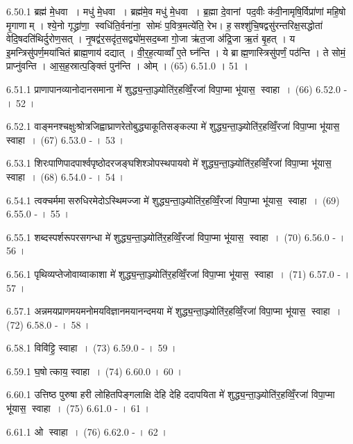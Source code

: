 6.50.1
ब्रह्म॑ मे॒धवा । मधु॑ मे॒धवा । ब्रह्म॑मे॒व मधु॑ मे॒धवा । ब्र॒ह्मा दे॒वानां पद॒वीः क॑वी॒नामृषि॒र्विप्रा॑णां महि॒षो मृ॒गाणाम् । श्ये॒नो गृद्ध्रा॑णा॒ स्वधि॑ति॒र्वना॑ना॒ सोमः॑ प॒वित्र॒मत्ये॑ति॒ रेभ\sn{}। ह॒सश्शु॑चि॒षद्वसु॑रन्तरिक्ष॒सद्धोता॑ वेदि॒षदति॑थिर्दुरोण॒सत् । नृ॒षद्व॑र॒सदृ॑त॒सद्व्यो॑म॒सद॒ब्जा गो॒जा ऋ॑त॒जा अ॑द्रि॒जा ऋ॒तं बृ॒हत् । य इ॒मन्त्रिसु॑पर्ण॒मया॑चितं ब्राह्म॒णाय॑ दद्यात् । वी॒र॒ह॒त्याव्वाँ ए॒ते घ्न॑न्ति । ये ब्राह्म॒णास्त्रिसु॑पर्णं॒ पठ॑न्ति । ते सोमं॒ प्राप्नु॑वन्ति । आ॒स॒ह॒स्रात्प॒ङ्क्तिं पुन॑न्ति । ओम् । (65)
6.51.0
। 51 ।
\anuvakamend

6.51.1
प्राणापानव्यानोदानसमाना मे॑ शुद्ध्य॒न्ता॒ञ्ज्योति॑र॒हव्विँ॒रजा॑ विपा॒प्मा भू॑यास॒ स्वाहा । (66)
6.52.0
- । 52 ।
\anuvakamend

6.52.1
वाङ्मनश्चक्षुःश्रोत्रजिह्वाघ्राणरेतोबुद्ध्याकूतिसङ्कल्पा मे॑ शुद्ध्य॒न्ता॒ञ्ज्योति॑र॒हव्विँ॒रजा॑ विपा॒प्मा भू॑यास॒ स्वाहा । (67)
6.53.0
- । 53 ।
\anuvakamend

6.53.1
शिरःपाणिपादपार्श्वपृष्ठोदरजङ्घशिश्ञोपस्थपायवो मे॑ शुद्ध्य॒न्ता॒ञ्ज्योति॑र॒हव्विँ॒रजा॑ विपा॒प्मा भू॑यास॒ स्वाहा । (68)
6.54.0
- । 54 ।
\anuvakamend

6.54.1
त्वक्चर्ममासरुधिरमेदोऽस्थिमज्जा मे॑ शुद्ध्य॒न्ता॒ञ्ज्योति॑र॒हव्विँ॒रजा॑ विपा॒प्मा भू॑यास॒ स्वाहा । (69)
6.55.0
- । 55 ।
\anuvakamend

6.55.1
शब्दस्पर्शरूपरसगन्धा मे॑ शुद्ध्य॒न्ता॒ञ्ज्योति॑र॒हव्विँ॒रजा॑ विपा॒प्मा भू॑यास॒ स्वाहा । (70)
6.56.0
- । 56 ।
\anuvakamend

6.56.1
पृथिव्यप्तेजोवाय्वाकाशा मे॑ शुद्ध्य॒न्ता॒ञ्ज्योति॑र॒हव्विँ॒रजा॑ विपा॒प्मा भू॑यास॒ स्वाहा । (71)
6.57.0
- । 57 ।
\anuvakamend

6.57.1
अन्नमयप्राणमयमनोमयविज्ञानमयानन्दमया मे॑ शुद्ध्य॒न्ता॒ञ्ज्योति॑र॒हव्विँ॒रजा॑ विपा॒प्मा भू॑यास॒ स्वाहा । (72)
6.58.0
- । 58 ।
\anuvakamend

6.58.1
विवि॑ट्टि॒ स्वाहा । (73)
6.59.0
- । 59 ।
\anuvakamend

6.59.1
घ॒षोत्काय॒ स्वाहा । (74)
6.60.0
। 60 ।
\anuvakamend

6.60.1
उत्तिष्ठ पुरुषा हरी लोहितपिङ्गलाक्षि देहि देहि ददापयिता मे॑ शुद्ध्य॒न्ता॒ञ्ज्योति॑र॒हव्विँ॒रजा॑ विपा॒प्मा भू॑यास॒ स्वाहा । (75)
6.61.0
- । 61 ।
\anuvakamend

6.61.1
ओ स्वाहा । (76)
6.62.0
- । 62 ।
\anuvakamend

